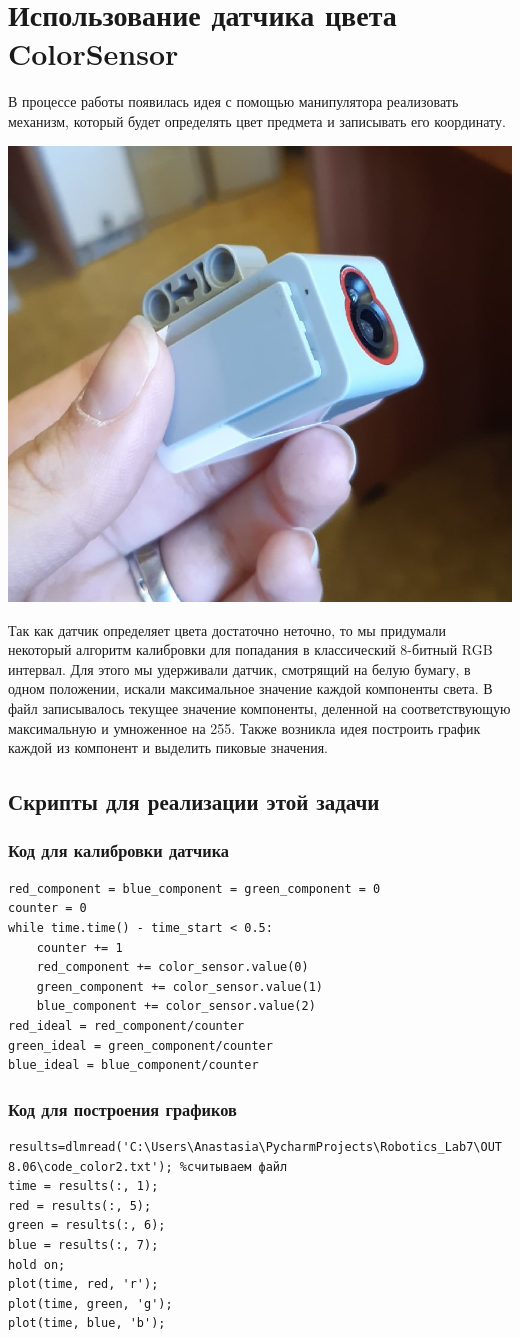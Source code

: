 \documentclass{article}
\begin{document}
\section{Использование датчика цвета ColorSensor}
\par В процессе работы появилась идея с помощью манипулятора реализовать механизм, который будет определять цвет предмета и записывать его координату.
\begin{floatingfigure}[l]{3.5 cm}
    \noindent
    \hfill
    \includegraphics[width=.2\textwidth]{color_sensor.jpg}
    \hfill
\end{floatingfigure}
\par Так как датчик определяет цвета достаточно неточно, то мы придумали некоторый алгоритм калибровки для попадания в классический 8-битный RGB интервал. Для этого мы удерживали датчик, смотрящий на белую бумагу, в одном положении, искали максимальное значение каждой компоненты света. В файл записывалось текущее значение компоненты, деленной на соответствующую максимальную и умноженное на 255. Также возникла идея построить график каждой из компонент и выделить пиковые значения. 


\subsection{Скрипты для реализации этой задачи}
\subsubsection*{Код для калибровки датчика}
\begin{verbatim}
red_component = blue_component = green_component = 0
counter = 0
while time.time() - time_start < 0.5:
    counter += 1
    red_component += color_sensor.value(0)
    green_component += color_sensor.value(1)
    blue_component += color_sensor.value(2)
red_ideal = red_component/counter
green_ideal = green_component/counter
blue_ideal = blue_component/counter
\end{verbatim}
\subsubsection*{Код для построения графиков}
\begin{verbatim}
results=dlmread('C:\Users\Anastasia\PycharmProjects\Robotics_Lab7\OUT 8.06\code_color2.txt'); %считываем файл
time = results(:, 1);
red = results(:, 5);
green = results(:, 6);
blue = results(:, 7);
hold on;
plot(time, red, 'r');
plot(time, green, 'g');
plot(time, blue, 'b');
\end{verbatim}
\end{document}
